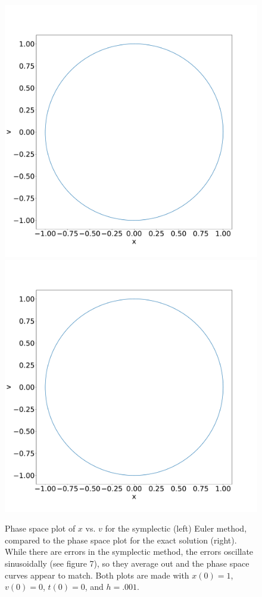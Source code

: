 \documentclass[11pt, oneside]{article}   	%
\begin{document}
\begin{section}
\begin{figure}[H]
\includegraphics[width=.5\textwidth, height=.35\textheight]{XvsVsymp.pdf}
\includegraphics[width=.5\textwidth, height=.35\textheight]{XvsVtrue.pdf}
\caption{Phase space plot of $x$ vs. $v$ for the symplectic (left) Euler method, compared to the phase space plot for the exact solution (right). While there are errors in the symplectic method, the errors oscillate sinusoidally (see figure 7), so they average out and the phase space curves appear to match. Both plots are made with $x(0) = 1$, $v(0) = 0$, $t(0) = 0$, and $h = .001$.}
\end{figure}


\end{section}
\end{document}
